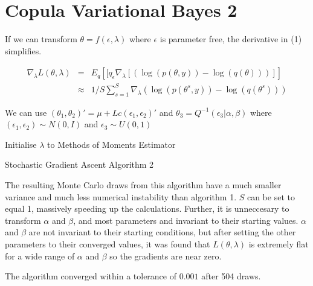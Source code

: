 \documentclass{article}
\begin{document}
\section{Copula Variational Bayes 2}

If we can transform $\theta = f(\epsilon, \lambda)$ where $\epsilon$ is parameter free, the derivative in (1) simplifies.

\begin{eqnarray}
\nabla_{\lambda} L(\theta, \lambda) & = & E_{q} \left[ [q_{\epsilon}\nabla_{\lambda}[(\log(p(\theta, y)) - \log(q(\theta)))] \right] \nonumber \\
& \approx & 1/S \sum_{s=1}^{S} \nabla_{\lambda}(\log(p(\theta^s, y)) - \log(q(\theta^s))) \nonumber
\end{eqnarray}

We can use $(\theta_1, \theta_2)' = \mu + L c(\epsilon_1, \epsilon_2)'$ and $\theta_3 = Q^{-1}(\epsilon_3 | \alpha, \beta)$ where $(\epsilon_1, \epsilon_2) \sim N(0, I)$ and $\epsilon_3 \sim U(0, 1)$

\begin{algorithm}[H]
 Initialise $\lambda$ to Methods of Moments Estimator\;
 \caption{Stochastic Gradient Ascent Algorithm 2}
\end{algorithm}

The resulting Monte Carlo draws from this algorithm have a much smaller variance and much less numerical instability than algorithm 1. $S$ can be set to equal 1, massively speeding up the calculations. Further, it is unneccesary to transform $\alpha$ and $\beta$, and most parameters and invariant to their starting values. $\alpha$ and $\beta$ are not invariant to their starting conditions, but after setting the other parameters to their converged values, it was found that $L(\theta, \lambda)$ is extremely flat for a wide range of $\alpha$ and $\beta$ so the gradients are near zero.

The algorithm converged within a tolerance of $0.001$ after 504 draws.
\end{document}
